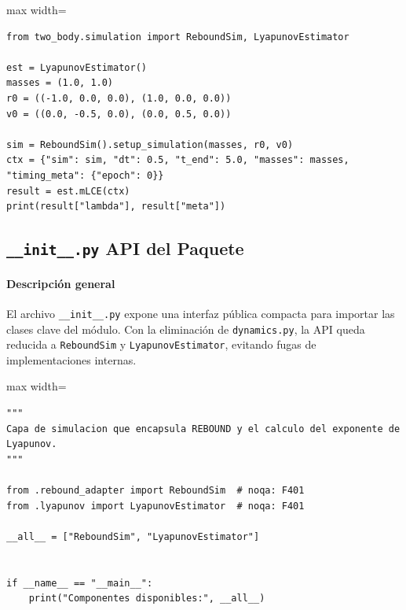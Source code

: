 \begin{listing}[H]
\caption{Ejemplo de uso de \texttt{LyapunovEstimator}}
\begin{adjustbox}{max width=\textwidth}
\begin{minipage}{\textwidth}
\begin{verbatim}
from two_body.simulation import ReboundSim, LyapunovEstimator

est = LyapunovEstimator()
masses = (1.0, 1.0)
r0 = ((-1.0, 0.0, 0.0), (1.0, 0.0, 0.0))
v0 = ((0.0, -0.5, 0.0), (0.0, 0.5, 0.0))

sim = ReboundSim().setup_simulation(masses, r0, v0)
ctx = {"sim": sim, "dt": 0.5, "t_end": 5.0, "masses": masses, "timing_meta": {"epoch": 0}}
result = est.mLCE(ctx)
print(result["lambda"], result["meta"])
\end{verbatim}
\end{minipage}
\end{adjustbox}
\end{listing}
\vspace{0.2cm}

\subsection{\texttt{\_\_init\_\_.py} \- API del Paquete}
\paragraph{Descripción general}
El archivo \texttt{\_\_init\_\_.py} expone una interfaz pública compacta para importar las clases clave del módulo. Con la eliminación de \texttt{dynamics.py}, la API queda reducida a \texttt{ReboundSim} y \texttt{LyapunovEstimator}, evitando fugas de implementaciones internas.\\

\begin{listing}[H]
\caption{Bloque de código de \texttt{\_\_init\_\_.py}}
\begin{adjustbox}{max width=\textwidth}
\begin{minipage}{\textwidth}
\begin{verbatim}
"""
Capa de simulacion que encapsula REBOUND y el calculo del exponente de Lyapunov.
"""

from .rebound_adapter import ReboundSim  # noqa: F401
from .lyapunov import LyapunovEstimator  # noqa: F401

__all__ = ["ReboundSim", "LyapunovEstimator"]


if __name__ == "__main__":
    print("Componentes disponibles:", __all__)
\end{verbatim}
\end{minipage}
\end{adjustbox}
\end{listing}

